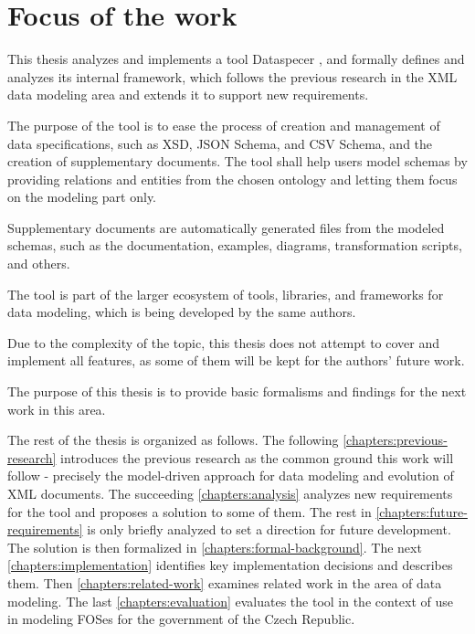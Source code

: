 \section*{Focus of the work}

This thesis analyzes and implements a tool Dataspecer \cite{dataspecer}, and formally defines and analyzes its internal framework, which follows the previous research \cite{necasky2007xsem, necasky2012conceptual, nevcasky2012evolution, xcase, exolutio} in the XML data modeling area and extends it to support new requirements.

The purpose of the tool is to ease the process of creation and management of data specifications, such as XSD, JSON Schema, and CSV Schema, and the creation of supplementary documents. The tool shall help users model schemas by providing relations and entities from the chosen ontology and letting them focus on the modeling part only.

Supplementary documents are automatically generated files from the modeled schemas, such as the documentation, examples, diagrams, transformation scripts, and others.

\medskip

The tool is part of the larger ecosystem of tools, libraries, and frameworks for data modeling, which is being developed by the same authors.

Due to the complexity of the topic, this thesis does not attempt to cover and implement all features, as some of them will be kept for the authors' future work.

The purpose of this thesis is to provide basic formalisms and findings for the next work in this area.

\bigskip

The rest of the thesis is organized as follows. The following \autoref{chapters:previous-research} introduces the previous research as the common ground this work will follow - precisely the model-driven approach for data modeling and evolution of XML documents. The succeeding \autoref{chapters:analysis} analyzes new requirements for the tool and proposes a solution to some of them. The rest in \autoref{chapters:future-requirements} is only briefly analyzed to set a direction for future development. The solution is then formalized in \autoref{chapters:formal-background}. The next \autoref{chapters:implementation} identifies key implementation decisions and describes them. Then \autoref{chapters:related-work} examines related work in the area of data modeling. The last \autoref{chapters:evaluation} evaluates the tool in the context of use in modeling FOSes for the government of the Czech Republic.
